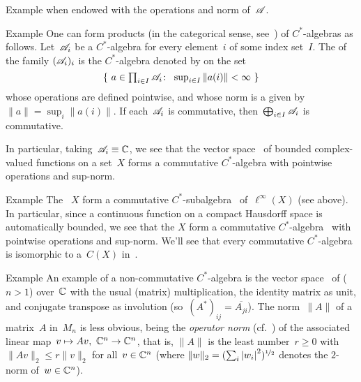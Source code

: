 \documentclass[a]{subfiles}
\begin{document}
\begin{parsec}
\begin{point}{Example}
when endowed with the operations and norm
of~$\mathscr{A}$.
\end{point}
\begin{point}{Example}%
One can form products (in the categorical sense,
see~) of $C^*$-algebras as follows.
Let~$\mathscr{A}_i$ be a $C^*$-algebra
for every element~$i$ of some index set~$I$.
The 
of the family $(\mathscr{A}_i)_i$
is the $C^*$-algebra
denoted by  on the set
\begin{equation*}
\textstyle
\{\  a\in \prod_{i\in I}\mathscr{A}_i\colon\  \sup_{i \in I} \|a(i)\|< \infty \ \}
\end{equation*}
whose operations are defined pointwise,
and whose norm is a  given by $\|a\|=\sup_{i}\|a(i)\|$.
If each~$\mathscr{A}_i$ is commutative,
then~$\bigoplus_{i\in I}\mathscr{A}_i$
is commutative.

In particular,
taking~$\mathscr{A}_i\equiv \mathbb{C}$,
we see that
the vector space~ of bounded complex-valued functions
on a set~$X$ forms a commutative $C^*$-algebra
with pointwise operations and sup-norm.
\end{point}
\begin{point}{Example}%
The ~$X$
form a commutative $C^*$-subalgebra~
of~$\ell^\infty(X)$ (see above).
In particular,
since a continuous function on a compact Hausdorff space is 
automatically bounded,
we see that the  $X$
form a commutative $C^*$-algebra~
with pointwise operations and sup-norm.
We'll see that every commutative $C^*$-algebra
is isomorphic to a~$C(X)$
in~.
\end{point}
\begin{point}{Example}%
An example of a non-commutative
$C^*$-algebra
is
the vector space~
of  ($n>1$) over~$\mathbb{C}$
with the usual (matrix) multiplication,
the identity matrix as unit,
and conjugate transpose
as involution
(so~$(A^*)_{ij} = \overline{A_{ji}}$).
The norm~$\|A\|$ of a matrix~$A$ in~$M_n$
is less obvious,
being
the \emph{operator norm}
(cf.~)
of the associated linear map~$v\mapsto Av,\ \C^n\to\C^n$,
that is,
$\|A\|$ is
the least number~$r\geq 0$
with $\|Av\|_2\leq r\|v\|_2$
for all~$v\in \mathbb{C}^n$
(where $\|w\|_2=(\sum_i \left|w_i\right|^2)^{\nicefrac{1}{2}}$
denotes the $2$-norm
of~$w\in \mathbb{C}^n$).


\end{point}
\end{parsec}
\end{document}
